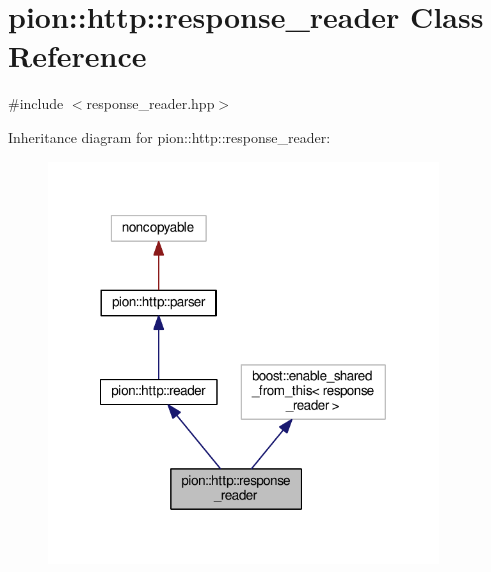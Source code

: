 \hypertarget{classpion_1_1http_1_1response__reader}{\section{pion\-:\-:http\-:\-:response\-\_\-reader Class Reference}
\label{classpion_1_1http_1_1response__reader}
}


{\ttfamily \#include $<$response\-\_\-reader.\-hpp$>$}



Inheritance diagram for pion\-:\-:http\-:\-:response\-\_\-reader\-:
\nopagebreak
\begin{figure}[H]
\begin{center}
\leavevmode
\includegraphics[width=293pt]{classpion_1_1http_1_1response__reader__inherit__graph}
\end{center}
\end{figure}


